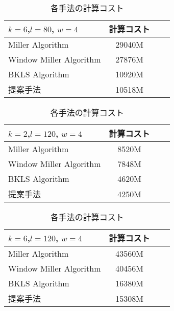 \begin{table}[htbp]
 \begin{center}
  \begin{tabular}{|l|c|c|c|}
  \hline

  $k=6$,$l=80$, $w=4$ & 計算コスト \\
  \hline
  Miller Algorithm & 29040M \\
  \hline
  Window Miller Algorithm & 27876M \\
  \hline
  BKLS Algorithm &  10920M \\
  \hline
  提案手法 & 10518M \\
  \hline
  \end{tabular}
 \end{center}
 \caption{各手法の計算コスト}
\end{table}

\begin{table}[htbp]
 \begin{center}
  \begin{tabular}{|l|c|c|c|}
  \hline
  $k=2$,$l=120$, $w=4$ & 計算コスト \\
  \hline
  Miller Algorithm & 8520M \\
  \hline
  Window Miller Algorithm & 7848M \\
  \hline
  BKLS Algorithm &  4620M \\
  \hline
  提案手法 & 4250M \\
  \hline
  \end{tabular}
 \end{center}
 \caption{各手法の計算コスト}
\end{table}

\clearpage

\begin{table}[htbp]
 \begin{center}
  \begin{tabular}{|l|c|c|c|}
  \hline
  $k=6$,$l=120$, $w=4$ & 計算コスト \\
  \hline
  Miller Algorithm & 43560M \\
  \hline
  Window Miller Algorithm & 40456M \\
  \hline
  BKLS Algorithm &  16380M \\
  \hline
  提案手法 & 15308M \\
  \hline
  \end{tabular}
 \end{center}
 \caption{各手法の計算コスト}
\end{table}

